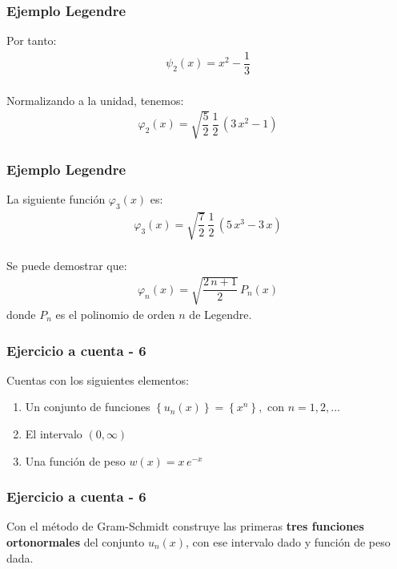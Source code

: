 \documentclass[12pt]{beamer}
\begin{document}
\begin{frame}
\frametitle{Ejemplo Legendre}
Por tanto:
\pause
\begin{align}
\psi_{2}(x) = x^{2} - \dfrac{1}{3}
\label{eq:ecuacion_10_57}
\end{align}
\\
\bigskip
\pause
Normalizando a la unidad, tenemos:
\pause
\begin{align}
\varphi_{2} (x) = \sqrt{\dfrac{5}{2}} \, \dfrac{1}{2} \, (3 \, x^{2} - 1)
\label{eq:ecuacion_10_58}
\end{align}
\end{frame}
\begin{frame}
\frametitle{Ejemplo Legendre}
La siguiente función $\varphi_{3}(x)$ es:
\pause
\begin{align}
\varphi_{3} (x) = \sqrt{\dfrac{7}{2}} \, \dfrac{1}{2} \, (5 \, x^{3} - 3 \, x)
\label{eq:ecuacion_10_59}
\end{align}
\\
\bigskip
\pause
Se puede demostrar que:
\pause
\begin{align}
\varphi_{n}(x) = \sqrt{\dfrac{2 \, n + 1}{2}} \, P_{n}(x)
\label{eq:ecuacion_10_60}
\end{align}
donde $P_{n}$ es el polinomio de orden $n$ de Legendre.
\end{frame}

\begin{frame}
\frametitle{Ejercicio a cuenta - 6}
Cuentas con los siguientes elementos:
\begin{enumerate}[<+->]
\item Un conjunto de funciones $\left\{ u_{n} (x) \right\} = \left\{ x^{n} \right\}, \mbox{ con } n = 1, 2, \ldots$
\item El intervalo $(0, \infty)$
\item Una función de peso $w(x) = x \, e^{-x}$
\end{enumerate}
\end{frame}
\begin{frame}
\frametitle{Ejercicio a cuenta - 6}
Con el método de Gram-Schmidt construye las primeras \textbf{tres funciones ortonormales} del conjunto $u_{n}(x)$, con ese intervalo dado y función de peso dada.
\end{frame}
\end{document}
